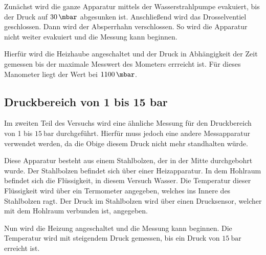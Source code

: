 Zunächst wird die ganze Apparatur mittels der Wasserstrahlpumpe evakuiert, bis der Druck auf $\SI{30}{\mbar}$ abgesunken ist.
Anschließend wird das Drosselventiel geschlossen.
Dann wird der Absperrhahn verschlossen.
So wird die Apparatur nicht weiter evakuiert und die Messung kann beginnen.

Hierfür wird die Heizhaube angeschaltet und der Druck in Abhängigkeit der Zeit gemessen bis der maximale Messwert des Mometers errreicht ist.
Für dieses Manometer liegt der Wert bei $\SI{1100}{\mbar}$.

\subsection{Druckbereich von 1 bis 15 bar}
Im zweiten Teil des Versuchs wird eine ähnliche Messung für den Druckbereich von 1 bis $\SI{15}{\bar}$ durchgeführt.
Hierfür muss jedoch eine andere Messapparatur verwendet werden, da die Obige diesem Druck nicht mehr standhalten würde.

Diese Apparatur besteht aus einem Stahlbolzen, der in der Mitte durchgebohrt wurde.
Der Stahlbolzen befindet sich über einer Heizapparatur.
In dem Hohlraum befindet sich die Flüssigkeit, in diesem Versuch Wasser.
Die Temperatur dieser Flüssigkeit wird über ein Termometer angegeben, welches ins Innere des Stahlbolzen ragt.
Der Druck im Stahlbolzen wird über einen Drucksensor, welcher mit dem Hohlraum verbunden ist, angegeben.

Nun wird die Heizung angeschaltet und die Messung kann beginnen.
Die Temperatur wird mit steigendem Druck gemessen, bis ein Druck von $\SI{15}{\bar}$ erreicht ist.
